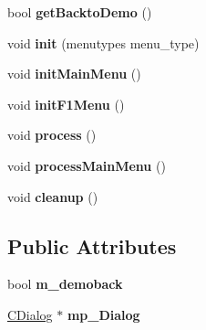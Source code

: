 \begin{DoxyCompactItemize}
\item 
\hypertarget{class_c_menu_ab2f04963ce897d2f229d3e9a2819eeb8}{
bool {\bfseries getBacktoDemo} ()}
\label{class_c_menu_ab2f04963ce897d2f229d3e9a2819eeb8}

\item 
\hypertarget{class_c_menu_a13f892349f76a38420317eb8ebe4bc77}{
void {\bfseries init} (menutypes menu\_\-type)}
\label{class_c_menu_a13f892349f76a38420317eb8ebe4bc77}

\item 
\hypertarget{class_c_menu_a1fca90f9c202d29ba21d3a925f3dc7e1}{
void {\bfseries initMainMenu} ()}
\label{class_c_menu_a1fca90f9c202d29ba21d3a925f3dc7e1}

\item 
\hypertarget{class_c_menu_a3824e00f9a2be0e964e93a9fed8db267}{
void {\bfseries initF1Menu} ()}
\label{class_c_menu_a3824e00f9a2be0e964e93a9fed8db267}

\item 
\hypertarget{class_c_menu_a678f9499c437fb02cbd2a49a88d583c2}{
void {\bfseries process} ()}
\label{class_c_menu_a678f9499c437fb02cbd2a49a88d583c2}

\item 
\hypertarget{class_c_menu_a819ae8a74eefb2b1c6a50b1bfd86fbba}{
void {\bfseries processMainMenu} ()}
\label{class_c_menu_a819ae8a74eefb2b1c6a50b1bfd86fbba}

\item 
\hypertarget{class_c_menu_a5f2d525873d26b870987d841087b0d68}{
void {\bfseries cleanup} ()}
\label{class_c_menu_a5f2d525873d26b870987d841087b0d68}

\end{DoxyCompactItemize}
\subsection*{Public Attributes}
\begin{DoxyCompactItemize}
\item 
\hypertarget{class_c_menu_a509d9a7b6c9674179dc07574ba046675}{
bool {\bfseries m\_\-demoback}}
\label{class_c_menu_a509d9a7b6c9674179dc07574ba046675}

\item 
\hypertarget{class_c_menu_a205bd04439302fce179ce16141cd298d}{
\hyperlink{class_c_dialog}{CDialog} $\ast$ {\bfseries mp\_\-Dialog}}
\label{class_c_menu_a205bd04439302fce179ce16141cd298d}

\end{DoxyCompactItemize}

